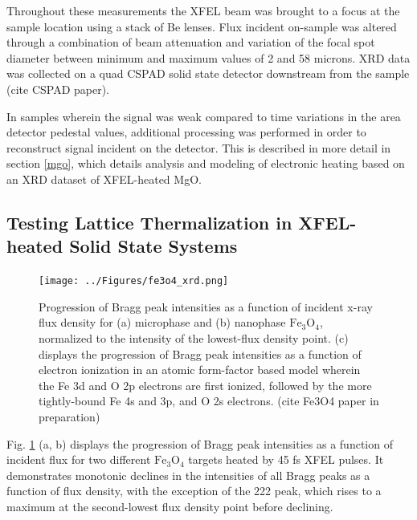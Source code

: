 \documentclass [11pt, proquest, article] {uwthesis}[2016/11/22]
\begin{document}
Throughout these measurements the XFEL beam was brought to a focus at the sample location using a stack of Be lenses. Flux incident on-sample was altered through a combination of beam attenuation and variation of the focal spot diameter between minimum and maximum values of 2 and 58 microns. XRD data was collected on a quad CSPAD solid state detector downstream from the sample (cite CSPAD paper).

In samples wherein the signal was weak compared to time variations in the area detector pedestal values, additional processing was performed in order to reconstruct signal incident on the detector. 
This is described in more detail in section \ref{mgo}, which details analysis and modeling of electronic heating based on an XRD dataset of XFEL-heated MgO.
 
\subsection{Testing Lattice Thermalization in XFEL-heated Solid State Systems}

\begin{figure}[h] 
	\caption{Progression of Bragg peak intensities as a function of incident x-ray flux density for (a) microphase and (b) nanophase $\mathrm{Fe}_3\mathrm{O}_4$, normalized to the intensity of the lowest-flux density point. (c) displays the progression of Bragg peak intensities as a function of electron ionization in an atomic form-factor based model wherein the Fe 3d and O 2p electrons are first ionized, followed by the more tightly-bound Fe 4s and 3p, and O 2s electrons. (cite Fe3O4 paper in preparation)}
\label{fexrd}
\centering
\texttt{[image: ../Figures/fe3o4\_xrd.png]}
\end{figure}

Fig. \ref{fexrd} (a, b) displays the progression of Bragg peak intensities as a function of incident flux for two different $\mathrm{Fe}_3\mathrm{O}_4$ targets heated by 45 fs XFEL pulses. It demonstrates monotonic declines in the intensities of all Bragg peaks as a function of flux density, with the exception of the 222 peak, which rises to a maximum at the second-lowest flux density point before declining.
\end{document}
